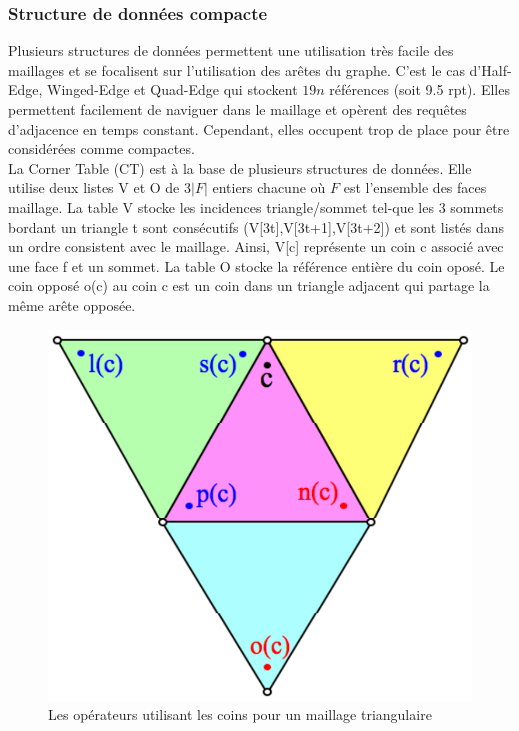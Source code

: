 \subsubsection{Structure de données compacte}
\noindent
Plusieurs structures de données permettent une utilisation très facile des maillages et se focalisent sur l'utilisation des arêtes du graphe. C'est le cas d'Half-Edge, Winged-Edge \cite{winged_edge} et Quad-Edge qui stockent $19n$ références (soit 9.5 rpt). Elles permettent facilement de naviguer dans le maillage et opèrent des requêtes d'adjacence en temps constant. Cependant, elles occupent trop de place pour être considérées comme compactes.\\
La Corner Table (CT) est à la base de plusieurs structures de données. Elle utilise deux listes V et O de $3|F|$ entiers chacune où $F$ est l'ensemble des faces maillage. La table V stocke les incidences triangle/sommet tel-que les 3 sommets bordant un triangle t sont consécutifs (V[3t],V[3t+1],V[3t+2]) et sont listés dans un ordre consistent avec le maillage. Ainsi, V[c] représente un coin c associé avec une face f et un sommet. La table O stocke la référence entière du coin oposé. Le coin opposé o(c) au coin c est un coin dans un triangle adjacent qui partage la même arête opposée.\\
\begin{figure}[th]
\begin{center}
\includegraphics[scale=0.2]{Images/corner_table}
\caption{Les opérateurs utilisant les coins pour un maillage triangulaire}
\label{fig:corner_table}
\end{center}
\end{figure}
